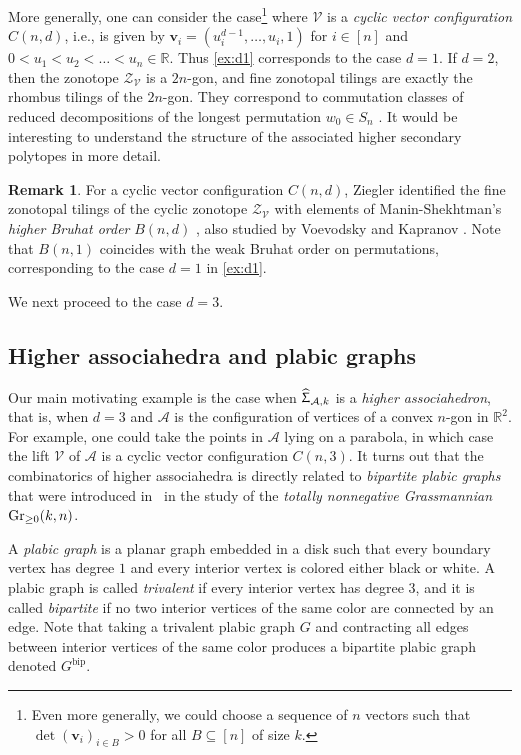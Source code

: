 \documentclass[11pt]{amsart}
\theoremstyle{plain}
\theoremstyle{definition}
\newtheorem{remark}[theorem]{Remark}
\def\R{\mathbb{R}}
\def\v{{\bm{v}}}
\def\A{\mathcal{A}}
\def\V{\mathcal{V}}
\def\Zon{\mathcal{Z}}
\def\ZV{\Zon_\V}
\def\HSP{\widehat\Upsigma}
\def\Sigma{\HSP}
\def\VC{\V}
\let\subset\subseteq
\begin{document}
More generally, one can consider the case\footnote{Even more generally, we could choose a sequence of $n$ vectors such that $\det(\v_i)_{i\in B}>0$ for all $B\subset [n]$ of size $k$.} where $\VC$ is a  \emph{cyclic vector configuration} $C(n,d)$, i.e., is given by $\v_i = (u_i^{d-1}, \dots, u_i, 1)$ for $i\in[n]$ and $0 < u_1 < u_2 < \dots < u_n \in \R$. 
Thus \cref{ex:d1}  corresponds to the case $d=1$. If $d=2$, 
then the zonotope $\ZV$ is a $2n$-gon, and fine zonotopal tilings are 
exactly the rhombus tilings of the $2n$-gon.  They correspond to commutation
classes of reduced decompositions of the longest permutation $w_0\in S_n$ \cite{Elnitsky}.
 It would be interesting to understand the structure of the associated higher secondary polytopes in more detail. 


 \begin{remark}\label{rem:higher}
 	For a cyclic vector configuration $C(n,d)$, Ziegler \cite{ZieglerHigher} identified the 
 fine zonotopal tilings of the cyclic zonotope $\ZV$ with elements of 
 Manin-Shekhtman's \emph{higher Bruhat order} $B(n,d)$ \cite{MS}, also studied by 
 	Voevodsky and Kapranov \cite{VK}.  Note that $B(n,1)$ coincides with the weak Bruhat 
 	order on permutations, corresponding to the case $d=1$ 
 in \cref{ex:d1}. 
 \end{remark}

We next proceed to the case $d=3$.


\def\Grtnn{\Gr_{\geq0}}
\def\BIP{{\operatorname{bip}}}
\def\bip#1{#1^{\BIP}}
\def\Gbip{\bip{G}}


\subsection{Higher associahedra and plabic graphs}\label{sec:high-assoc-plab}
Our main motivating example is the case when $\Sigma_{\A,k}$ is a \emph{higher associahedron}, that is, when $d=3$ and 
$\A$ is the configuration of vertices of a convex $n$-gon in $\R^2$. For example, one could take the points in $\A$ lying on a parabola, in which case the lift $\VC$ of $\A$ is a cyclic vector configuration $C(n,3)$. It turns out that the combinatorics of higher associahedra is directly related to \emph{bipartite plabic graphs} that were introduced in~\cite{Pos06} in the study of the \emph{totally nonnegative Grassmannian} $\Grtnn(k,n)$. 

A \emph{plabic graph} is a planar graph embedded in a disk 
such that every boundary vertex has degree $1$ and every interior vertex is colored either black or white. A plabic graph is called \emph{trivalent} if every interior vertex has degree $3$, and it is called \emph{bipartite} if no two interior vertices of the same color are connected by an edge. Note that  taking a trivalent plabic graph $G$ and contracting all edges between interior vertices of the same color produces a bipartite plabic graph denoted $\Gbip$.
\end{document}
